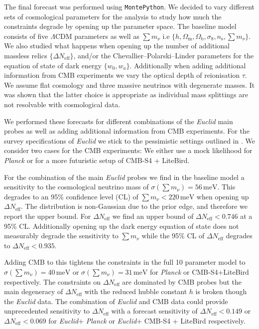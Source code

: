 \documentclass[a4paper,11pt]{article}
\newcommand{\euclid}{\textit{Euclid}\xspace}
\newcommand{\planck}{\textit{Planck}\xspace}
\newcommand{\dneff}{\Delta N_\mathrm{eff}}
\newcommand{\summnu}{\sum m_\nu}
\newcommand{\montepython}{\texttt{MontePython}\xspace}
\begin{document}
The final forecast was performed using \montepython. We decided to vary different sets of cosmological parameters for the analysis to study how much the constraints degrade by opening up the parameter space. The baseline model consists of  five $\varLambda$CDM parameters as well as $\summnu$ i.e $\{h, \Omega_\mathrm{m}, \Omega_\mathrm{b}, \sigma_8, n_\mathrm{s}, \summnu\}$. We also studied what happens when opening up the number of additional massless relics $\{\dneff\}$, and/or the Chevallier--Polarski--Linder parameters for the equation of state of dark energy $\{w_0,w_a\}$. Additionally when adding additional information from CMB experiments we vary the optical depth of reionisation $\tau$. We assume flat cosmology and three massive neutrinos with degenerate masses. It was shown that the latter choice is appropriate as individual mass splittings are not resolvable with cosmological data\cite{Lesgourgues:2013sjj}.

We performed these forecasts for different combinations of the \euclid main probes as well as adding additional information from CMB experiments. For the survey specifications of \euclid we stick to the pessimistic settings outlined in \cite{ISTF2020}. We consider two cases for the CMB experiments: We either use a mock likelihood for \planck or for a more futuristic setup of CMB-S4 + LiteBird.

For the combination of the main \euclid probes we find in the baseline model a sensitivity to the cosmological neutrino mass of $\sigma\left(\summnu\right) = 56\,\mathrm{meV}$. This degrades to an 95\% confidence level (CL) of $\summnu<220\,\mathrm{meV}$ when opening up $\dneff$. The distribution is non-Gaussian due to the prior edge, and therefore we report the upper bound. For $\dneff$ we find an upper bound of $\dneff<0.746$ at a 95\% CL. Additionally opening up the dark energy equation of state does not measurably degrade the sensitivity to $\summnu$ while the 95\% CL of $\dneff$ degrades to $\dneff<0.935$.  

Adding CMB to this tightens the constraints in the full 10 parameter model to $\sigma\left(\summnu\right) = 40\,\mathrm{meV}$ or $\sigma\left(\summnu\right) = 31\,\mathrm{meV}$ for \planck or CMB-S4+LiteBird respectively. The constraints on $\dneff$ are dominated by CMB probes but the main degeneracy of $\dneff$ with the reduced hubble constant $h$ is broken though the \euclid data. The combination of \euclid and CMB data could provide unprecedented sensitivity to $\dneff$ with a forecast sensitivity of $\dneff<0.149$ or $\dneff<0.069$ for \euclid + \planck or \euclid + CMB-S4 + LiteBird respectively. 
\end{document}
